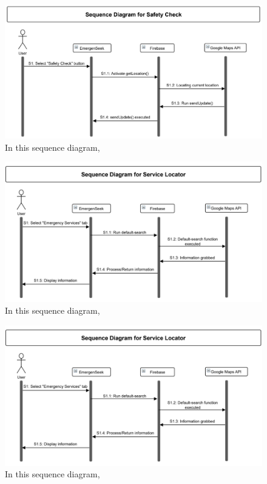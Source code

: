 \documentclass[10pt, a4paper]{article}
\begin{document}
\begin{figure}[H]
  \centerline{
  	\includegraphics[scale=0.8]{diagrams/sequence-1.png}
  }  
  \caption{In this sequence diagram,}
\end{figure}

\begin{figure}[H]
  \centerline{
  	\includegraphics[scale=0.8]{diagrams/sequence-2.png}
  }  
  \caption{In this sequence diagram,}
\end{figure}

\begin{figure}[H]
  \centerline{
  	\includegraphics[scale=0.8]{diagrams/sequence-2.png}
  }  
  \caption{In this sequence diagram,}
\end{figure}
\end{document}
